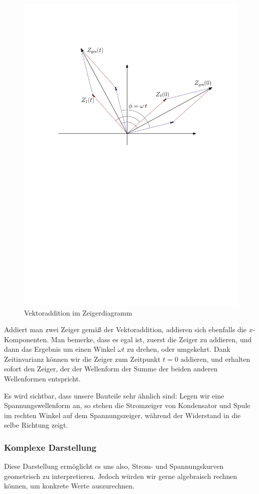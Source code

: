 \begin{figure}[H]
    \centering
    \includegraphics[width=.7\textwidth]{kZeiger.pdf}
    \caption{Vektoraddition im Zeigerdiagramm}
\end{figure}

Addiert man zwei Zeiger gemäß der Vektoraddition, addieren sich ebenfalls die $x$-Komponenten. Man bemerke, dass es egal
ist, zuerst die Zeiger zu addieren, und dann das Ergebnis um einen Winkel $\omega t$ zu drehen, oder umgekehrt. Dank
Zeitinvarianz können wir die Zeiger zum Zeitpunkt $t = 0$ addieren, und erhalten sofort den Zeiger, der der Wellenform
der Summe der beiden anderen Wellenformen entspricht.

Es wird sichtbar, dass unsere Bauteile sehr ähnlich sind: Legen wir eine Spannungswellenform an, so stehen die
Stromzeiger von Kondensator und Spule im rechten Winkel auf dem Spannungszeiger, während der Widerstand in die selbe
Richtung zeigt.




\subsubsection{Komplexe Darstellung}
Diese Darstellung ermöglicht es uns also, Strom- und Spannungskurven geometrisch zu interpretieren. Jedoch würden wir gerne
algebraisch rechnen können, um konkrete Werte auszurechnen.

